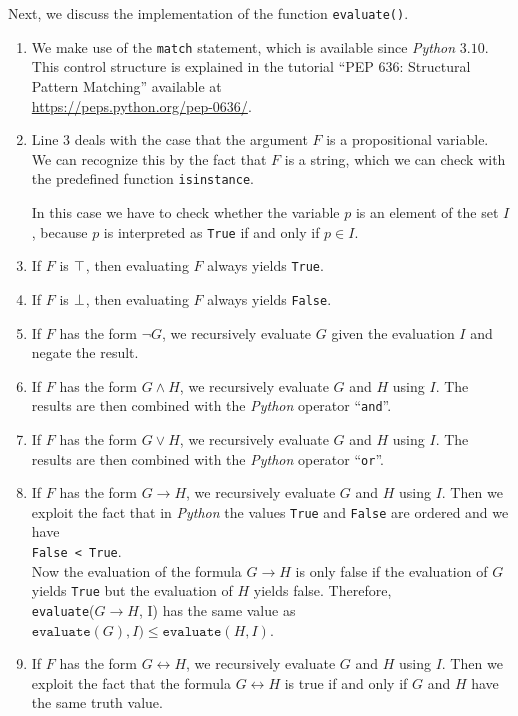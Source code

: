\noindent
Next, we discuss the implementation of the function \texttt{evaluate()}.
\begin{enumerate}
\item We make use of the \texttt{match} statement, which is available since \textsl{Python} $3.10$.
      This control structure is explained in the tutorial ``PEP 636: Structural Pattern Matching''
      available at
      \\[0.2cm]
      \hspace*{1.3cm}
      \href{https://peps.python.org/pep-0636/}{https://peps.python.org/pep-0636/}.
\item Line 3 deals with the case that the argument $F$ is a propositional variable.  We can recognize this by
      the fact that $F$ is a string, which we can check with the predefined function
      \texttt{isinstance}.

      In this case we have to check whether the variable $p$ is an element of the set $I$, because $p$ is
      interpreted as \texttt{True} if and only if $p \in I$.
\item If $F$ is $\top$, then evaluating $F$ always yields \texttt{True}.
\item If $F$ is $\bot$, then evaluating $F$ always yields \texttt{False}. 
\item If $F$ has the form $\neg G$, we recursively evaluate $G$ given the evaluation $I$ and negate the result.
\item If $F$ has the form $G \wedge H$, we recursively evaluate
      $G$ and $H$ using $I$.  The results are then combined with the \textsl{Python} operator
      ``\texttt{and}''.
\item If $F$ has the form $G \vee H$, we recursively evaluate
      $G$ and $H$ using $I$.  The results are then combined with the \textsl{Python} operator
      ``\texttt{or}''.
\item If $F$ has the form $G \rightarrow H$, we recursively evaluate
      $G$ and $H$ using $I$.  Then we exploit the fact that in \textsl{Python} the values \texttt{True} and
      \texttt{False} are ordered and we have
      \\[0.2cm]
      \hspace*{1.3cm}
      \texttt{False < True}.
      \\[0.2cm]
      Now the evaluation of the formula $G \rightarrow H$ is only false if the evaluation of $G$ yields \texttt{True} but the
      evaluation of $H$ yields false.  Therefore, 
      \\[0.2cm]
      \hspace*{1.3cm}
      \texttt{evaluate}($G \rightarrow H$, I) \quad has the same value as \quad
      $\texttt{evaluate}(G), I) \leq \texttt{evaluate}(H, I)$.
\item If $F$ has the form $G \leftrightarrow H$, we recursively evaluate
      $G$ and $H$ using $I$.  Then we exploit the fact that the formula $G \leftrightarrow H$ is true if and
      only if $G$ and $H$ have the same truth value.
\end{enumerate}


